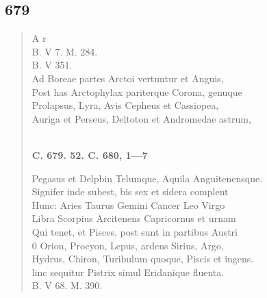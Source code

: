 \documentclass[11pt, a4paper]{report}
\begin{document}
            \subsection*{679}
      \begin{verse}
      A r \\ B. V 7. M. 284. \\ B. V 351. \\ Ad Boreae partes Arctoi vertuntur et Anguis, \\ Post has Arctophylax pariterque Corona, genuque \\ Prolapsus, Lyra, Avis Cepheus et Cassiopea, \\ Auriga et Perseus, Deltoton et Andromedae astrum, \\ 
        ﻿\pagebreak 
    \begin{center} \textbf{C. 679. 52. C. 680, 1—7} \end{center} \marginpar{[155]} Pegasus et Delpbin Telumque, Aquila Anguitenensque. \\ Signifer inde subest, bis sex et sidera complent \\ Hunc: Aries Taurus Gemini Cancer Leo Virgo \\ Libra Scorpius Arcitenens Capricornus et urnam \\ Qui tenet, et Pisces. post sunt in partibus Austri \\ 0 Orion, Procyon, Lepus, ardens Sirius, Argo, \\ Hydrus, Chiron, Turibulum quoque, Piscis et ingens. \\ linc sequitur Pistrix simul Eridanique fluenta. \\ B. V 68. M. 390. \\ 
      \end{verse}
  
\end{document}
